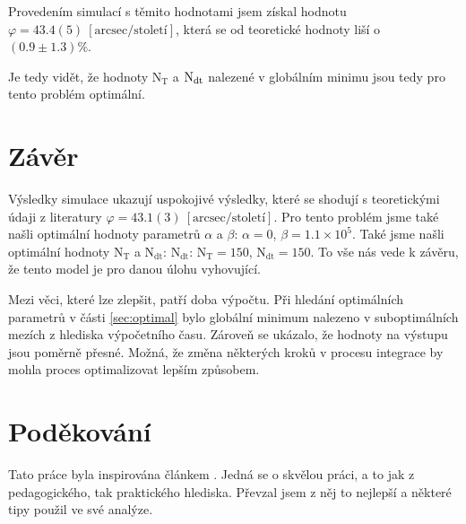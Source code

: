 \documentclass[a4paper,11pt,twocolumn]{article}
\begin{document}
            Provedením simulací s těmito hodnotami jsem získal hodnotu $\varphi = 43.4(5) ~[\text{arcsec/století}]$, která se od teoretické hodnoty liší o $(0.9 \pm 1.3)\%$. 
            
            Je tedy vidět, že hodnoty $\text{N}_{\text{T}}$ a $\text{N}_{\text{\text{dt}}}$ nalezené v globálním minimu jsou tedy pro tento problém optimální.

    \section{Závěr}
        Výsledky simulace ukazují uspokojivé výsledky, které se shodují s teoretickými údaji z literatury $\varphi = 43.1(3) ~[\text{arcsec/století}]$. Pro tento problém jsme také našli optimální hodnoty parametrů $\alpha$ a $\beta$: $\alpha = 0$, $\beta = 1.1 \times 10^5$. Také jsme našli optimální hodnoty $\text{N}_{\text{T}}$ a $\text{N}_{\text{dt}}$: $\text{N}_{\text{dt}}$: $\text{N}_{\text{T}} = 150$, $\text{N}_{\text{dt}} = 150$. To vše nás vede k závěru, že tento model je pro danou úlohu vyhovující. 
        
        Mezi věci, které lze zlepšit, patří doba výpočtu. Při hledání optimálních parametrů v části \ref{sec:optimal} bylo globální minimum nalezeno v suboptimálních mezích z hlediska výpočetního času. Zároveň se ukázalo, že hodnoty na výstupu jsou poměrně přesné. Možná, že změna některých kroků v procesu integrace by mohla proces optimalizovat lepším způsobem. 

    
    

    \section*{Poděkování}
        Tato práce byla inspirována článkem \citet{korber2018}. Jedná se o skvělou práci, a to jak z pedagogického, tak praktického hlediska. Převzal jsem z něj to nejlepší a některé tipy použil ve své analýze. 
\end{document}
